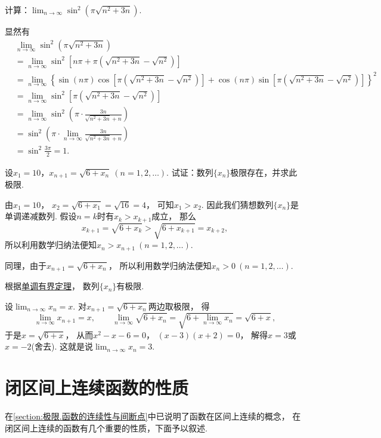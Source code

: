 \begin{example}
\def\l{\lim_{n\to\infty}}
计算：\(\l \sin^2(\pi\sqrt{n^2+3n})\).
\begin{solution}
\def\a{\pi(\sqrt{n^2+3n}-\sqrt{n^2})}
显然有\begin{align*}
&\l \sin^2(\pi\sqrt{n^2+3n}) \\
&= \l \sin^2[n\pi+\a] \\
&= \l \left\{ \sin(n\pi) \cos\left[\a\right] + \cos(n\pi) \sin\left[\a\right] \right\}^2 \\
&= \l \sin^2\left[\a\right] \\
&= \l \sin^2\left( \pi \cdot \frac{3n}{\sqrt{n^2+3n}+n} \right) \\
&= \sin^2 \left( \pi \cdot \l \frac{3n}{\sqrt{n^2+3n}+n} \right) \\
&= \sin^2 \frac{3\pi}{2}
= 1.
\end{align*}
\end{solution}
\end{example}

\begin{example}
设\(x_1=10\)，\(x_{n+1}=\sqrt{6+x_n}\ (n=1,2,\dotsc)\).
试证：数列\(\{x_n\}\)极限存在，并求此极限.
\begin{solution}
由\(x_1=10\)，
\(x_2=\sqrt{6+x_1}=\sqrt{16}=4\)，
可知\(x_1>x_2\).
因此我们猜想数列\(\{x_n\}\)是单调递减数列.
假设\(n=k\)时有\(x_k>x_{k+1}\)成立，
那么\[
	x_{k+1}=\sqrt{6+x_k}>\sqrt{6+x_{k+1}}=x_{k+2},
\]
所以利用数学归纳法便知\(x_n>x_{n+1}\ (n=1,2,\dotsc)\).

同理，由于\(x_{n+1}=\sqrt{6+x_n}\)，
所以利用数学归纳法便知\(x_n>0\ (n=1,2,\dotsc)\).

根据\hyperref[theorem:极限.数列的单调有界定理]{单调有界定理}，
数列\(\{x_n\}\)有极限.

设\(\lim_{n\to\infty}x_n=x\).
对\(x_{n+1}=\sqrt{6+x_n}\)两边取极限，
得\[
	\lim_{n\to\infty}x_{n+1}=x, \qquad
	\lim_{n\to\infty}\sqrt{6+x_n}
	=\sqrt{6+\lim_{n\to\infty}x_n}
	=\sqrt{6+x},
\]
于是\(x=\sqrt{6+x}\)，
从而\(x^2-x-6=0\)，
\((x-3)(x+2)=0\)，
解得\(x=3\)或\(x=-2\)(舍去).
这就是说\(\lim_{n\to\infty}x_n=3\).
\end{solution}
\end{example}

\section{闭区间上连续函数的性质}
在\cref{section:极限.函数的连续性与间断点}中已说明了函数在区间上连续的概念，
在闭区间上连续的函数有几个重要的性质，下面予以叙述.

